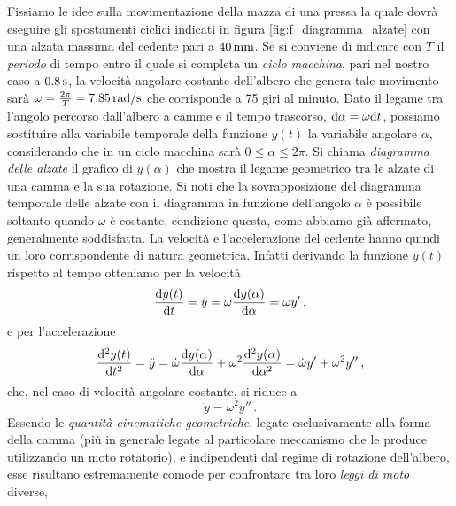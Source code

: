 \noindent Fissiamo le idee sulla movimentazione della mazza di una pressa
la quale dovr\`a eseguire gli spostamenti ciclici indicati
in figura \ref{fig:f_diagramma_alzate}
con una alzata massima del cedente pari
a $40\,{\rm mm}$.
Se si conviene di indicare con $T$ il {\em periodo} di tempo entro il 
quale si completa un {\em ciclo macchina}, pari
nel nostro caso a $0.8\,{\rm s}$,
la velocit\`a angolare costante dell'albero che genera tale movimento sar\`a
$\omega = {2\pi \over{T}}=7.85\,{\rm rad}/{\rm s}$ che corrisponde a 75
giri al minuto.
Dato il legame tra l'angolo percorso dall'albero a camme e il tempo trascorso,
${\rm d}\alpha= \omega {\rm d}t$,  possiamo sostituire alla variabile temporale
della funzione $y(t)$ la variabile angolare $\alpha$, considerando che
in un ciclo macchina sar\`a $0 \leq \alpha \leq 2\pi$.  
Si chiama {\em diagramma delle alzate}
il grafico di $y(\alpha)$ che mostra il legame geometrico tra le alzate di una
camma e la sua rotazione.
Si noti che la sovrapposizione del diagramma temporale delle alzate con il diagramma in funzione dell'angolo $\alpha$ \`e possibile
soltanto quando $\omega$ \`e costante, condizione questa, come abbiamo gi\`a affermato,
generalmente soddisfatta. La velocit\`a e l'accelerazione del cedente hanno
quindi un loro corrispondente di natura geometrica. Infatti derivando la 
funzione $y(t)$ rispetto al tempo otteniamo per la velocit\`a
\begin{equation}
{{\rm d}y(t)\over{{\rm d}t}}= \dot y= \omega {{\rm d}y(\alpha)\over{{\rm d}\alpha}}= \omega y'\,,
\end{equation}
\noindent e per l'accelerazione
\begin{equation}
{{\rm d}^2y(t)\over{{\rm d}t^2}}= \ddot y= \dot\omega 
{{\rm d}y(\alpha)\over{{\rm d}\alpha}}+
\omega^2 {{\rm d}^2y(\alpha)\over{{\rm d}\alpha^2}}=\dot\omega y' + \omega^2 y''\,,
\end{equation}
\noindent che, nel caso di velocit\`a angolare costante, si riduce a
\begin{equation}
\ddot y= \omega^2 y''\,.
\end{equation}
\noindent Essendo le {\em quantit\`a cinematiche geometriche}, legate esclusivamente alla forma
della camma (pi\`u in generale legate al particolare meccanismo che le produce
utilizzando un moto rotatorio), e indipendenti dal regime di rotazione dell'albero,
esse risultano
estremamente comode per confrontare tra loro
{\em leggi di moto} diverse,
